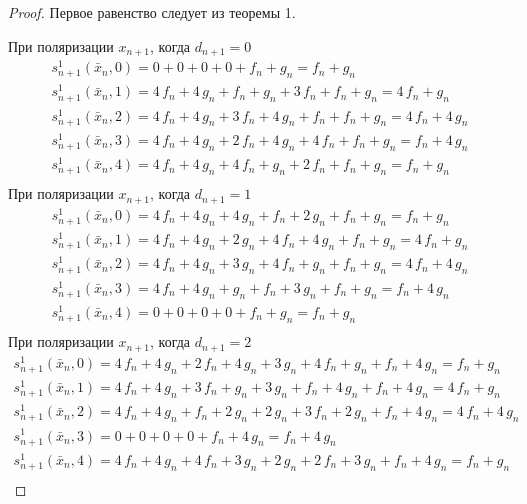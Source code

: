 \documentclass[bibliography=totoc, a4paper, 14pt]{extarticle}
\begin{document}
 \begin{proof}

Первое равенство следует из теоремы 1.

При поляризации $x_{n+1}$, когда $d_{n+1} = 0$
$$\begin{array}{l}
s_{n+1}^1(\bar{x}_n, 0) = 0 + 0 + 0 + 0 + f_n + g_n = f_n + g_n \\
s_{n+1}^1(\bar{x}_n, 1) = 4\,f_n + 4\,g_n + f_n + g_n + 3\,f_n + f_n + g_n = 4\,f_n + g_n \\
s_{n+1}^1(\bar{x}_n, 2) = 4\,f_n + 4\,g_n + 3\,f_n + 4\,g_n + f_n + f_n + g_n = 4\,f_n + 4\,g_n \\
s_{n+1}^1(\bar{x}_n, 3) = 4\,f_n + 4\,g_n + 2\,f_n + 4\,g_n + 4\,f_n + f_n + g_n = f_n + 4\,g_n \\
s_{n+1}^1(\bar{x}_n, 4) = 4\,f_n + 4\,g_n + 4\,f_n + g_n + 2\,f_n + f_n + g_n = f_n + g_n \\
\end{array}$$
При поляризации $x_{n+1}$, когда $d_{n+1} = 1$
$$\begin{array}{l}
s_{n+1}^1(\bar{x}_n, 0) = 4\,f_n + 4\,g_n + 4\,g_n + f_n + 2\,g_n + f_n + g_n = f_n + g_n \\
s_{n+1}^1(\bar{x}_n, 1) = 4\,f_n + 4\,g_n + 2\,g_n + 4\,f_n + 4\,g_n + f_n + g_n = 4\,f_n + g_n \\
s_{n+1}^1(\bar{x}_n, 2) = 4\,f_n + 4\,g_n + 3\,g_n + 4\,f_n + g_n + f_n + g_n = 4\,f_n + 4\,g_n \\
s_{n+1}^1(\bar{x}_n, 3) = 4\,f_n + 4\,g_n + g_n + f_n + 3\,g_n + f_n + g_n = f_n + 4\,g_n \\
s_{n+1}^1(\bar{x}_n, 4) = 0 + 0 + 0 + 0 + f_n + g_n = f_n + g_n \\
\end{array}$$
При поляризации $x_{n+1}$, когда $d_{n+1} = 2$
$$\begin{array}{l}
s_{n+1}^1(\bar{x}_n, 0) = 4\,f_n + 4\,g_n + 2\,f_n + 4\,g_n + 3\,g_n + 4\,f_n + g_n + f_n + 4\,g_n = f_n + g_n \\
s_{n+1}^1(\bar{x}_n, 1) = 4\,f_n + 4\,g_n + 3\,f_n + g_n + 3\,g_n + f_n + 4\,g_n + f_n + 4\,g_n = 4\,f_n + g_n \\
s_{n+1}^1(\bar{x}_n, 2) = 4\,f_n + 4\,g_n + f_n + 2\,g_n + 2\,g_n + 3\,f_n + 2\,g_n + f_n + 4\,g_n = 4\,f_n + 4\,g_n \\
s_{n+1}^1(\bar{x}_n, 3) = 0 + 0 + 0 + 0 + f_n + 4\,g_n = f_n + 4\,g_n \\
s_{n+1}^1(\bar{x}_n, 4) = 4\,f_n + 4\,g_n + 4\,f_n + 3\,g_n + 2\,g_n + 2\,f_n + 3\,g_n + f_n + 4\,g_n = f_n + g_n \\

\end{array}$$
\end{proof}
\end{document}
